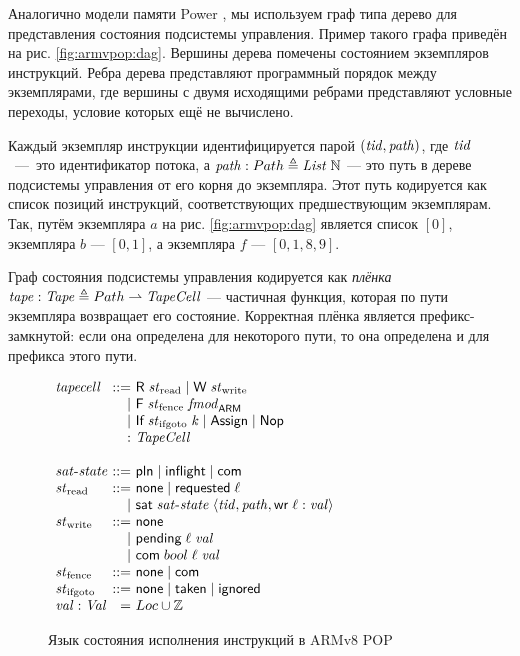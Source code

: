 Аналогично модели памяти Power \cite{Sarkar-al:PLDI11}, мы используем граф типа дерево
для представления состояния подсистемы управления.
Пример такого графа приведён на рис. \ref{fig:armvpop:dag}.
Вершины дерева помечены состоянием экземпляров инструкций.
Ребра дерева представляют программный порядок между экземплярами, где
вершины с двумя исходящими ребрами представляют условные переходы, условие
которых ещё не вычислено.

Каждый экземпляр инструкции идентифицируется парой $(\mathit{tid},\mathit{path})$,
где $\mathit{tid}$~---~это идентификатор потока,
а $\mathit{path} : Path \triangleq \mathit{List}\;{\mathbb{N}}$ --- это путь в дереве подсистемы управления
от его корня до экземпляра. Этот путь кодируется как список позиций инструкций, соответствующих
предшествующим экземплярам. Так, путём экземпляра $a$ на рис. \ref{fig:armvpop:dag} является
список $[0]$, экземпляра $b$ --- $[0,1]$, а экземпляра $f$ --- $[0,1,8,9]$.

Граф состояния подсистемы управления кодируется как \emph{плёнка}
$\mathit{tape} : \mathit{Tape} \triangleq Path \rightharpoonup \mathit{TapeCell}$ --- частичная функция, которая по пути экземпляра
возвращает его состояние. Корректная плёнка является префикс-замкнутой: если она определена для
некоторого пути, то она определена и для префикса этого пути.

\begin{figure}
  \begin{center}
$\begin{array}{l @{~} r @{~} l}
\tapeCell & ::= & \tapeRead{\Rstate} \mid \tapeWrite{\Wstate} \\
          & |   & \tapeFence{\Fstate}{\Ftype} \\
          & |   & \tapeIfGoto{\IfState}{\z} \mid \tapeAssign \mid \tapeNop \\
          & :   & \TapeCell \\
\\
\satisfiedState & ::= & \Plain \mid \SatisfiedInFlight \mid \Committed \\
\Rstate & ::= & \None \mid \Issued{\loc} \\
        & |   & \tapeSatisfied{\satisfiedState}{\stRequestWrite{\tId}{\cpath}{\loc}{\stval}} \\
\Wstate   & ::= & \None \\
          & |   & \tapePending{\loc}{\stval} \\
         & |   & \tapeWriteCommitted{bool}{\loc}{\stval}\\
\Fstate  & ::= & \None \mid \Committed\\
\IfState & ::= & \None \mid \Taken \mid \Ignored \; \\
\stval   :  \Stval  &  = & \Loc \cup \mathbb{Z} \\
\end{array}$
  \end{center}
\caption{Язык состояния исполнения инструкций в ARMv8 POP}
\label{fig:tape-arm}
\end{figure}


